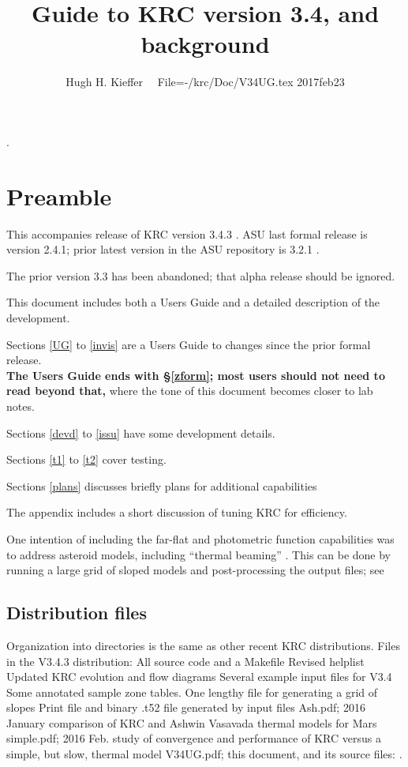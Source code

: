 \documentclass{article}
\title{Guide to KRC version 3.4, and background }
\author{Hugh H. Kieffer  \ \ File=-/krc/Doc/V34UG.tex  2017feb23}
\begin{document}
\maketitle
\tableofcontents
\listoffigures
\hrulefill .\hrulefill

\section{Preamble}
This accompanies release of KRC version 3.4.3 . ASU last formal
release is version 2.4.1; prior latest version in the ASU repository is 3.2.1 .

The prior version 3.3 has been abandoned; that alpha release should be ignored.

This document includes both a Users Guide and a detailed description of the development.

Sections \ref{UG} to \ref{invis} are a Users Guide to changes since the prior formal release.
\\ \textbf{ The Users Guide ends with  \S \ref{zform}; most users should not need to read beyond that,} where the tone of this document becomes closer to lab notes.  

Sections \ref{devd} to \ref{issu} have some development details.
 
Sections \ref{t1} to \ref{t2} cover testing.

Sections \ref{plans} discusses briefly plans for additional capabilities

The appendix includes a short discussion of tuning KRC for efficiency. 

One intention of including the far-flat and photometric function capabilities was
to address asteroid models, including ``thermal beaming'' . This can be done by
running a large grid of sloped models and post-processing the output files; see
 

\subsection{Distribution files}
 Organization into directories is the same as other recent KRC distributions. 
Files in the V3.4.3 distribution: 
\qi All source code and a Makefile
\qi Revised helplist
\qi Updated KRC evolution and flow diagrams
\qi Several example input files for V3.4
\qii Some annotated sample zone tables.
\qii One lengthy file for generating a grid of slopes 
\qi Print file and binary .t52 file generated by input files
\qi Ash.pdf; 2016 January comparison of KRC and Ashwin Vasavada thermal models for Mars
\qi simple.pdf; 2016 Feb. study of convergence and performance of KRC versus a simple, but slow, thermal model
\qi V34UG.pdf; this document, and its source files: .
\end{document}
